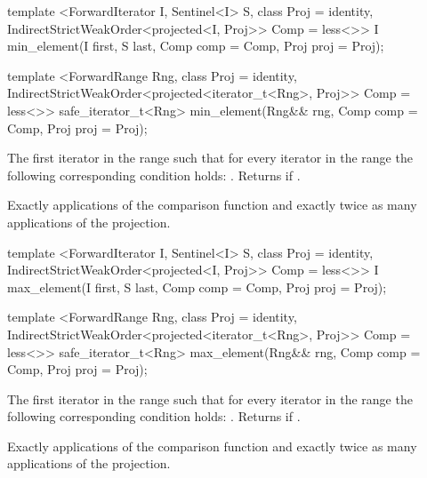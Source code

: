 %
\begin{itemdecl}
template <ForwardIterator I, Sentinel<I> S, class Proj = identity,
    IndirectStrictWeakOrder<projected<I, Proj>> Comp = less<>>
  I min_element(I first, S last, Comp comp = Comp{}, Proj proj = Proj{});

template <ForwardRange Rng, class Proj = identity,
    IndirectStrictWeakOrder<projected<iterator_t<Rng>, Proj>> Comp = less<>>
  safe_iterator_t<Rng>
    min_element(Rng&& rng, Comp comp = Comp{}, Proj proj = Proj{});
\end{itemdecl}

\begin{itemdescr}
\pnum
\returns
The first iterator
in the range
such that for every iterator
in the range
the following corresponding condition holds:
.
Returns
if
.

\pnum
\complexity
Exactly
applications of the comparison function and
exactly twice as many applications of the projection.
\end{itemdescr}

%
\begin{itemdecl}
template <ForwardIterator I, Sentinel<I> S, class Proj = identity,
    IndirectStrictWeakOrder<projected<I, Proj>> Comp = less<>>
  I max_element(I first, S last, Comp comp = Comp{}, Proj proj = Proj{});

template <ForwardRange Rng, class Proj = identity,
    IndirectStrictWeakOrder<projected<iterator_t<Rng>, Proj>> Comp = less<>>
  safe_iterator_t<Rng>
    max_element(Rng&& rng, Comp comp = Comp{}, Proj proj = Proj{});
\end{itemdecl}

\begin{itemdescr}
\pnum
\returns
The first iterator
in the range
such that for every iterator
in the range
the following corresponding condition holds:
.
Returns
if
.

\pnum
\complexity
Exactly
applications of the comparison function and
exactly twice as many applications of the projection.
\end{itemdescr}

